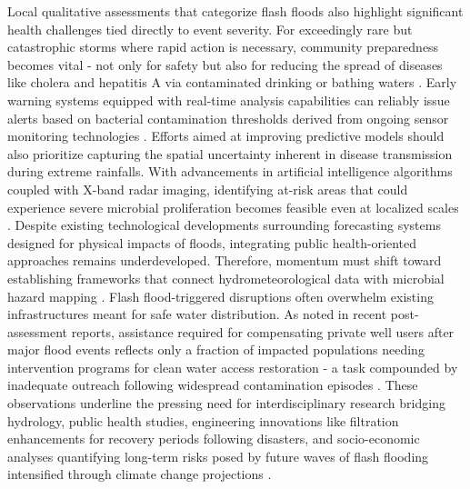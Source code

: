 Local qualitative assessments that categorize flash floods also highlight significant health challenges tied directly to event severity. For exceedingly rare but catastrophic storms where rapid action is necessary, community preparedness becomes vital - not only for safety but also for reducing the spread of diseases like cholera and hepatitis A via contaminated drinking or bathing waters \citep{Martinaitis2023}. Early warning systems equipped with real-time analysis capabilities can reliably issue alerts based on bacterial contamination thresholds derived from ongoing sensor monitoring technologies \citep{Msigwa2024}.
Efforts aimed at improving predictive models should also prioritize capturing the spatial uncertainty inherent in disease transmission during extreme rainfalls. With advancements in artificial intelligence algorithms coupled with X-band radar imaging, identifying at-risk areas that could experience severe microbial proliferation becomes feasible even at localized scales \citep{Khan2020}.
Despite existing technological developments surrounding forecasting systems designed for physical impacts of floods, integrating public health-oriented approaches remains underdeveloped. Therefore, momentum must shift toward establishing frameworks that connect hydrometeorological data with microbial hazard mapping \citep{Fowler2021}\citep{Archer2019}.
Flash flood-triggered disruptions often overwhelm existing infrastructures meant for safe water distribution. As noted in recent post-assessment reports, assistance required for compensating private well users after major flood events reflects only a fraction of impacted populations needing intervention programs for clean water access restoration - a task compounded by inadequate outreach following widespread contamination episodes \citep{Abegaz2024}. These observations underline the pressing need for interdisciplinary research bridging hydrology, public health studies, engineering innovations like filtration enhancements for recovery periods following disasters, and socio-economic analyses quantifying long-term risks posed by future waves of flash flooding intensified through climate change projections \citep{AlRawas2024}\citep{DuchenneMoutien2021}.
